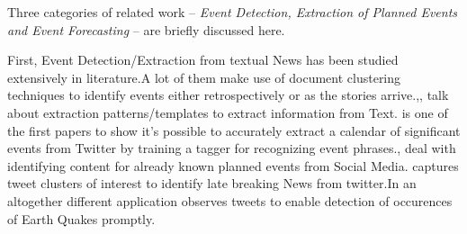 Three categories of related work -- \emph{Event Detection, Extraction of Planned Events and  Event Forecasting} -- are briefly discussed here.

First, Event Detection/Extraction from textual News has been studied extensively in literature.A lot of them make use of document clustering techniques \cite{Allan:2002:TDT} \cite{Yang:1998:SRO}\cite{Gabrilovich:2004:NPP}to identify events either retrospectively or as the stories arrive.\cite{Chambers:2011:TIE},\cite{Banko07openinformation}, \cite{Riloff:2003:LEP} talk about extraction patterns/templates to extract information from Text. \cite{Ritter:2012} is one of the first papers to show it's possible to accurately extract a calendar of significant events from Twitter by training a tagger for recognizing event phrases.\cite{Becker:2012:ICP}, \cite{Becker_automaticidentification} deal with identifying content for already known planned events from Social Media.\cite{Sankaranarayanan:2009:TNT} captures tweet clusters of interest to identify late breaking News from twitter.In an altogether different application \cite{Sakaki:2010:EST} observes tweets to enable detection of occurences of Earth Quakes promptly.

